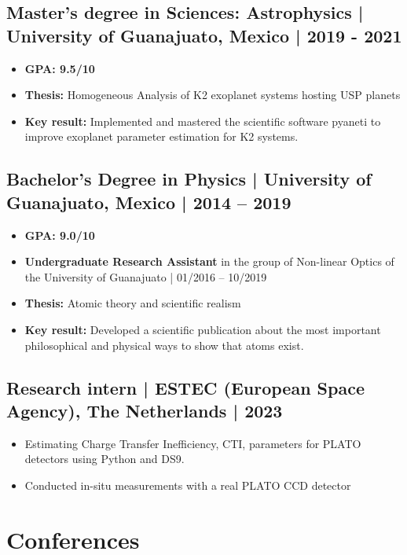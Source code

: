 \documentclass[11pt,a4paper]{article}
\begin{document}
\begin{multicols}{2}
		\subsection{Master's degree in Sciences: Astrophysics | University of Guanajuato, Mexico | 2019 - 2021}
		\begin{itemize}
		\item \textbf{GPA: 9.5/10}
		\item \textbf{Thesis:} Homogeneous Analysis of K2 exoplanet systems hosting USP planets
		\item \textbf{Key result:} Implemented and mastered the scientific software pyaneti to improve exoplanet parameter estimation for K2 systems. 
		\end{itemize}
		
		\subsection{ Bachelor's Degree in Physics | University of Guanajuato, Mexico | 2014 – 2019}
		\begin{itemize}
			\item \textbf{GPA: 9.0/10}
			\item \textbf{Undergraduate Research Assistant} in the group of Non-linear Optics of the University of Guanajuato | 01/2016 – 10/2019
			\item \textbf{Thesis:} Atomic theory and scientific realism
			\item \textbf{Key result:} Developed a scientific publication about the most important philosophical and physical ways to show that atoms exist. 
		\end{itemize}
		
		\subsection{Research intern | ESTEC (European Space Agency), The Netherlands | 2023}
		\begin{itemize}
			\item Estimating Charge Transfer Inefficiency, CTI, parameters for PLATO detectors using Python and DS9.
			\item Conducted in-situ measurements with a real PLATO CCD detector
		\end{itemize}
	\end{multicols}
	
	\section{Conferences}
\end{document}
